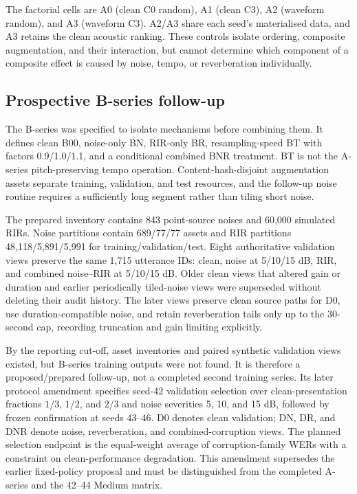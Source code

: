 \documentclass[12pt,a4paper]{report}
\begin{document}
The factorial cells are A0 (clean C0 random), A1 (clean C3), A2 (waveform random), and A3 (waveform C3). A2/A3 share each seed's materialised data, and A3 retains the clean acoustic ranking. These controls isolate ordering, composite augmentation, and their interaction, but cannot determine which component of a composite effect is caused by noise, tempo, or reverberation individually.

\subsection{Prospective B-series follow-up}

The B-series was specified to isolate mechanisms before combining them. It defines clean B00, noise-only BN, RIR-only BR, resampling-speed BT with factors 0.9/1.0/1.1, and a conditional combined BNR treatment. BT is not the A-series pitch-preserving tempo operation. Content-hash-disjoint augmentation assets separate training, validation, and test resources, and the follow-up noise routine requires a sufficiently long segment rather than tiling short noise.

The prepared inventory contains 843 point-source noises and 60,000 simulated RIRs. Noise partitions contain 689/77/77 assets and RIR partitions 48,118/5,891/5,991 for training/validation/test. Eight authoritative validation views preserve the same 1,715 utterance IDs: clean, noise at 5/10/15 dB, RIR, and combined noise--RIR at 5/10/15 dB. Older clean views that altered gain or duration and earlier periodically tiled-noise views were superseded without deleting their audit history. The later views preserve clean source paths for D0, use duration-compatible noise, and retain reverberation tails only up to the 30-second cap, recording truncation and gain limiting explicitly.

By the reporting cut-off, asset inventories and paired synthetic validation views existed, but B-series training outputs were not found. It is therefore a proposed/prepared follow-up, not a completed second training series. Its later protocol amendment specifies seed-42 validation selection over clean-presentation fractions $1/3$, $1/2$, and $2/3$ and noise severities 5, 10, and 15 dB, followed by frozen confirmation at seeds 43--46. D0 denotes clean validation; DN, DR, and DNR denote noise, reverberation, and combined-corruption views. The planned selection endpoint is the equal-weight average of corruption-family WERs with a constraint on clean-performance degradation. This amendment supersedes the earlier fixed-policy proposal and must be distinguished from the completed A-series and the 42--44 Medium matrix.
\end{document}
